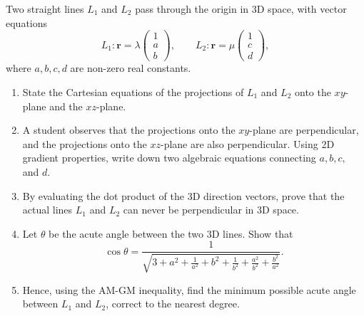 \begin{problem}
Two straight lines $L_1$ and $L_2$ pass through the origin in 3D space, with vector equations
\[
L_1: \mathbf{r} = \lambda \begin{pmatrix} 1 \\ a \\ b \end{pmatrix},
\qquad
L_2: \mathbf{r} = \mu \begin{pmatrix} 1 \\ c \\ d \end{pmatrix},
\]
where $a, b, c, d$ are non-zero real constants.
\begin{enumerate}[label=(\roman*)]
    \item State the Cartesian equations of the projections of $L_1$ and $L_2$ onto the $xy$-plane and the $xz$-plane.
    \item A student observes that the projections onto the $xy$-plane are perpendicular, and the projections onto the $xz$-plane are also perpendicular. Using 2D gradient properties, write down two algebraic equations connecting $a, b, c,$ and $d$.
    \item By evaluating the dot product of the 3D direction vectors, prove that the actual lines $L_1$ and $L_2$ can never be perpendicular in 3D space.
    \item Let $\theta$ be the acute angle between the two 3D lines. Show that
    \[
    \cos \theta = \frac{1}{\sqrt{3 + a^2 + \frac{1}{a^2} + b^2 + \frac{1}{b^2} + \frac{a^2}{b^2} + \frac{b^2}{a^2}}}.
    \]
    \item Hence, using the AM-GM inequality, find the minimum possible acute angle between $L_1$ and $L_2$, correct to the nearest degree.
\end{enumerate}
\end{problem}

